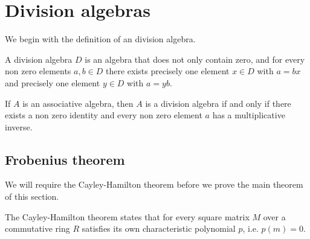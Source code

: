\documentclass[../Thesis.tex]{subfiles}
\begin{document}
\section{Division algebras}
We begin with the definition of an division algebra.
\begin{mydef}
A division algebra $D$ is an algebra that does not only contain zero, and for every non zero elements $a,b \in D$ there exists precisely one element $x \in D$ with $a = bx$ and precisely one element $y \in D$ with $a = yb$.
\end{mydef}
\begin{lemma}
If $A$ is an associative algebra, then $A$ is a division algebra if and only if there exists a non zero identity and every non zero element $a$ has a multiplicative inverse.
\end{lemma}
\subsection{Frobenius theorem}
We will require the Cayley-Hamilton theorem before we prove the main theorem of this section.

\begin{theorem}
The Cayley-Hamilton theorem states that for every square matrix $M$ over a commutative ring $R$ satisfies its own characteristic polynomial $p$, i.e. $p(m) = 0$.
\end{theorem}
\end{document}
